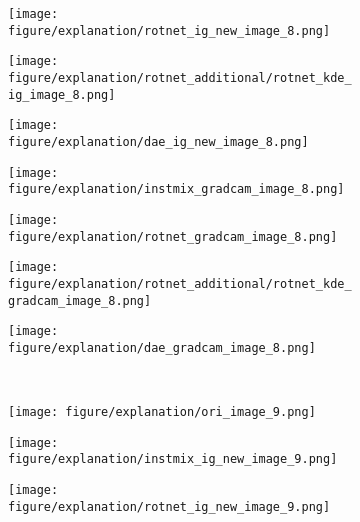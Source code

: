 \documentclass{article} \usepackage{iclr2021_conference,times}
\begin{document}
\begin{figure}[h!]
\begin{subfigure}{.11\textwidth}
  \centering
  \texttt{[image: figure/explanation/rotnet\_ig\_new\_image\_8.png]}
\end{subfigure}
\hspace{-2mm}
\begin{subfigure}{.11\textwidth}
  \centering
  \texttt{[image: figure/explanation/rotnet\_additional/rotnet\_kde\_ig\_image\_8.png]}
\end{subfigure}
\hspace{-2mm}
\begin{subfigure}{.11\textwidth}
  \centering
  \texttt{[image: figure/explanation/dae\_ig\_new\_image\_8.png]}
\end{subfigure}
\hspace{-2mm}
\begin{subfigure}{.11\textwidth}
  \centering
  \texttt{[image: figure/explanation/instmix\_gradcam\_image\_8.png]}
\end{subfigure}
\hspace{-2mm}
\begin{subfigure}{.11\textwidth}
  \centering
  \texttt{[image: figure/explanation/rotnet\_gradcam\_image\_8.png]}
\end{subfigure}
\hspace{-2mm}
\begin{subfigure}{.11\textwidth}
  \centering
  \texttt{[image: figure/explanation/rotnet\_additional/rotnet\_kde\_gradcam\_image\_8.png]}
\end{subfigure}
\hspace{-2mm}
\begin{subfigure}{.11\textwidth}
  \centering
  \texttt{[image: figure/explanation/dae\_gradcam\_image\_8.png]}
\end{subfigure}\\
\begin{subfigure}{.11\textwidth}
  \centering
  \texttt{[image: figure/explanation/ori\_image\_9.png]}
\end{subfigure}
\hspace{-2mm}
\begin{subfigure}{.11\textwidth}
  \centering
  \texttt{[image: figure/explanation/instmix\_ig\_new\_image\_9.png]}
\end{subfigure}
\hspace{-2mm}
\begin{subfigure}{.11\textwidth}
  \centering
  \texttt{[image: figure/explanation/rotnet\_ig\_new\_image\_9.png]}

\end{subfigure}
\end{figure}
\end{document}
